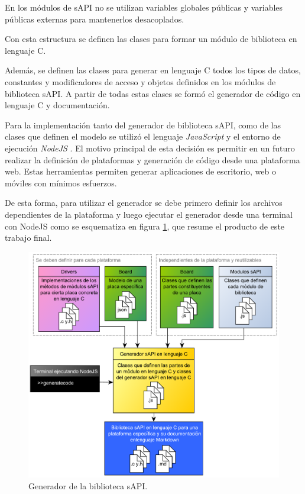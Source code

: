 En los módulos de sAPI no se utilizan variables globales públicas y variables públicas externas para mantenerlos desacoplados.

Con esta estructura se definen las clases para formar un módulo de biblioteca en lenguaje C.

Además, se definen las clases para generar en lenguaje C todos los tipos de datos, constantes y modificadores de acceso y objetos definidos en los módulos de biblioteca sAPI. A partir de todas estas clases se formó el generador de código en lenguaje C y documentación.

Para la implementación tanto del generador de biblioteca sAPI, como de las clases que definen el modelo se utilizó el lenguaje \emph{JavaScript} \citep{JavaScript} y el entorno de ejecución \emph{NodeJS} \citep{NodeJS}. El motivo principal de esta decisión es permitir en un futuro realizar la definición de plataformas y generación de código desde una plataforma web. Estas herramientas permiten generar aplicaciones de escritorio, web o móviles con mínimos esfuerzos.

De esta forma, para utilizar el generador se debe primero definir los archivos dependientes de la plataforma y luego ejecutar el generador desde una terminal con NodeJS como se esquematiza en figura \ref{fig:fullSapiGen}, que resume el producto de este trabajo final.

\begin{figure}[!htbp]
\begin{center}  %
\includegraphics*[width=14.5cm]{Figures/sapi_gen2.pdf}
\par\caption{Generador de la biblioteca sAPI.}\label{fig:fullSapiGen}
\end{center}
\end{figure}

